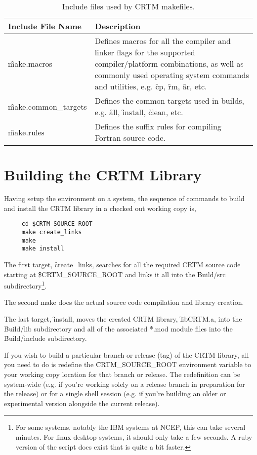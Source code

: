 \begin{table}[htb]
  \centering
  \begin{tabular}{p{4.5cm} p{9.5cm}}
    \hline
    \sffamily\textbf{Include File Name} & \sffamily\textbf{Description} \\
    \hline\hline
    \f{make.macros}          & Defines macros for all the compiler and linker flags for the supported compiler/platform combinations, as well as commonly used operating system commands and utilities, e.g. \f{cp}, \f{rm}, \f{ar}, etc. \\
    \f{make.common\_targets} & Defines the common targets used in builds, e.g. \f{all}, \f{install}, \f{clean}, etc. \\
    \f{make.rules}           & Defines the suffix rules for compiling Fortran source code. \\
    \hline
  \end{tabular}
  \caption{Include files used by CRTM makefiles.}
  \label{tab:make_includes}
\end{table}


\section{Building the CRTM Library}
\label{sec:crtm_build}
Having setup the environment on a system, the sequence of commands to build and install the CRTM library in a checked out working copy is,
\begin{ttfamily}
  \begin{verbatim}
     cd $CRTM_SOURCE_ROOT
     make create_links
     make
     make install\end{verbatim}
\end{ttfamily}
The first target, \f{create\_links}, searches for all the required CRTM source code starting at \f{\$CRTM\_SOURCE\_ROOT} and links it all into the \f{Build/src} subdirectory\footnote{For some systems, notably the IBM systems at NCEP, this can take several minutes. For linux desktop systems, it should only take a few seconds. A ruby version of the script does exist that is quite a bit faster.}.

The second make does the actual source code compilation and library creation.

The last target, \f{install}, moves the created CRTM library, \f{libCRTM.a}, into the \f{Build/lib} subdirectory and all of the associated \f{*.mod} module files into the \f{Build/include} subdirectory.

If you wish to build a particular branch or release (tag) of the CRTM library, all you need to do is redefine the \f{CRTM\_SOURCE\_ROOT} environment variable to your working copy location for that branch or release. The redefinition can be system-wide (e.g. if you're working solely on a release branch in preparation for the release) or for a single shell session (e.g. if you're building an older or experimental version alongside the current release).

